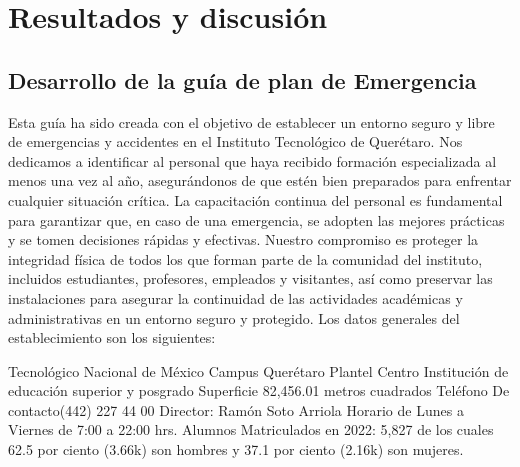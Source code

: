     
    
    \section{Resultados y discusión}
    
    \subsection{Desarrollo de la guía de plan de Emergencia}
    
    Esta guía ha sido creada con el objetivo de establecer un entorno seguro y libre de emergencias y accidentes en el Instituto Tecnológico de Querétaro. Nos dedicamos a identificar al personal que haya recibido formación especializada al menos una vez al año, asegurándonos de que estén bien preparados para enfrentar cualquier situación crítica. La capacitación continua del personal es fundamental para garantizar que, en caso de una emergencia, se adopten las mejores prácticas y se tomen decisiones rápidas y efectivas. Nuestro compromiso es proteger la integridad física de todos los que forman parte de la comunidad del instituto, incluidos estudiantes, profesores, empleados y visitantes, así como preservar las instalaciones para asegurar la continuidad de las actividades académicas y administrativas en un entorno seguro y protegido.
    Los datos generales del establecimiento son los siguientes:
    
    Tecnológico Nacional de México Campus Querétaro Plantel Centro
    Institución de educación superior y posgrado
    Superficie 82,456.01 metros cuadrados 
    Teléfono De contacto(442) 227 44 00
    Director: Ramón Soto Arriola
    Horario de Lunes a Viernes de 7:00 a 22:00 hrs.
    Alumnos Matriculados en 2022: 5,827 de los cuales 62.5 por ciento (3.66k) son hombres y 37.1 por ciento (2.16k) son mujeres.
    
